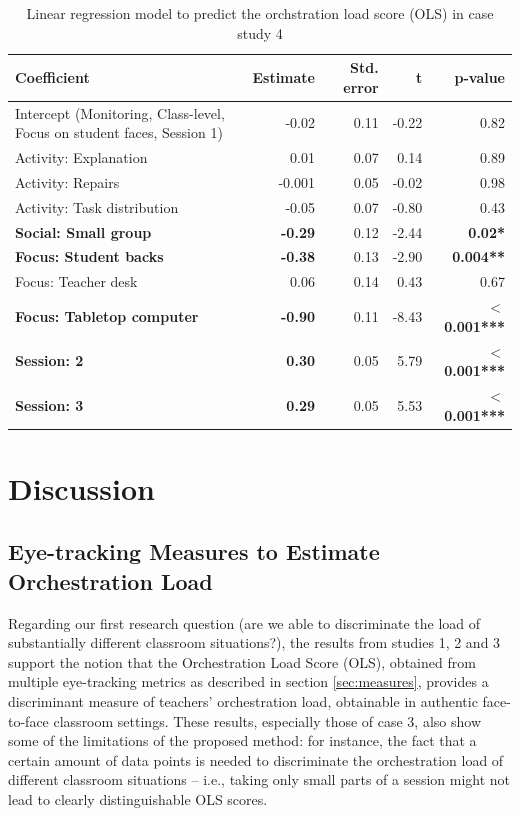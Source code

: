 \documentclass[10pt,journal,compsoc]{IEEEtran}
\begin{document}
\begin{table}[!t]
\caption{Linear regression model to predict the orchstration load score (OLS) in case study 4}
\label{tab:case4results}
\centering
\begin{tabular}{|p{2.6cm}||r|r|r|r|}
\hline
Coefficient & Estimate & Std. error & t & p-value\\
\hline
\hline
Intercept (Monitoring, Class-level, Focus on student faces, Session 1) & -0.02 & 0.11 & -0.22 & 0.82\\
Activity: Explanation & 0.01 & 0.07 & 0.14 & 0.89\\
Activity: Repairs & -0.001 & 0.05 & -0.02 & 0.98\\
Activity: Task distribution & -0.05 & 0.07 & -0.80 & 0.43\\
\textbf{Social: Small group} & \textbf{-0.29} & 0.12 & -2.44 & \textbf{0.02*}\\
\textbf{Focus: Student backs} & \textbf{-0.38} & 0.13 & -2.90 & \textbf{0.004**}\\
Focus: Teacher desk & 0.06 & 0.14 & 0.43 & 0.67\\
\textbf{Focus: Tabletop computer} & \textbf{-0.90} & 0.11 & -8.43 & \textbf{$<$0.001***}\\
\textbf{Session: 2} & \textbf{0.30} & 0.05 & 5.79 & \textbf{$<$0.001***}\\
\textbf{Session: 3} & \textbf{0.29} & 0.05 & 5.53 & \textbf{$<$0.001***}\\
\hline
\end{tabular}
\end{table}


\section{Discussion}
\label{sec:discussion}

\subsection{Eye-tracking Measures to Estimate Orchestration Load}

Regarding our first research question (are we able to discriminate the load of substantially different classroom situations?), the results from studies 1, 2 and 3 support the notion that the Orchestration Load Score (OLS), obtained from multiple eye-tracking metrics as described in section \ref{sec:measures}, provides a discriminant measure of teachers' orchestration load, obtainable in authentic face-to-face classroom settings. These results, especially those of case 3, also show some of the limitations of the proposed method: for instance, the fact that a certain amount of data points is needed to discriminate the orchestration load of different classroom situations -- i.e., taking only small parts of a session might not lead to clearly distinguishable OLS scores.
\end{document}

